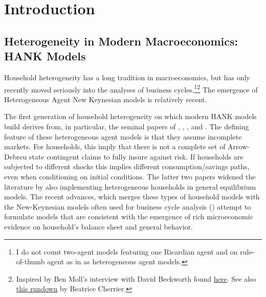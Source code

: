 




\section{Introduction}
\label{chap:intro}










\subsection{Heterogeneity in Modern Macroeconomics: HANK Models}
Household heterogeneity has a long tradition in macroeconomics, but has only recently moved seriously into the analyses of business cycles.\footnote{I do not count two-agent models featuring one Ricardian agent and on rule-of-thumb agent as in \citet{campbell1989consumption} as heterogeneous agent models.}\footnote{Inspired by Ben Moll's interview with David Beckworth found \hyperlink{https://www.mercatus.org/bridge/commentary/ben-moll-basics-hank-models-and-how-they-can-be-applied-policymaking}{here}. See also \hyperlink{https://beatricecherrier.wordpress.com/2018/11/28/heterogeneous-agent-macroeconomics-has-a-long-history-and-it-raises-many-questions/}{this rundown} by Beatrice Cherrier.} The emergence of Heterogeneous Agent New Keynesian models is relatively recent.

The first generation of household heterogeneity on which modern HANK models build derives from, in particular, the seminal papers of \citet{bewley1976permanent}, \citet{huggett1993risk}, \citet{aiyagari1994uninsured}, and \citet{krusell1998income}. The defining feature of these heterogeneous agent models is that they assume incomplete markets. For households, this imply that there is not a complete set of Arrow-Debreu state contingent claims to fully insure against risk. If households are subjected to different shocks this implies different consumption/savings paths, even when conditioning on initial conditions. The latter two papers widened the literature by also implementing heterogeneous households in general equilibrium models. The recent advances, which merges these types of household models with the New-Keynesian models often used for business cycle analysis () attempt to formulate models that are consistent with the emergence of rich microeconomic evidence on household's balance sheet and general behavior. 

